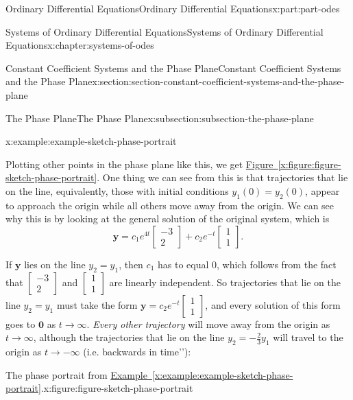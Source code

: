 \documentclass[twoside,10pt,]{book}
\newcommand{\xreffont}{\relax}
\numberwithin{equation}{part}
\renewcommand{\vec}[1]{\mathbf{#1}}
\begin{document}
\begin{partptx}{Ordinary Differential Equations}{}{Ordinary Differential Equations}{}{}{x:part:part-odes}
\begin{chapterptx}{Systems of Ordinary Differential Equations}{}{Systems of Ordinary Differential Equations}{}{}{x:chapter:systems-of-odes}
\begin{sectionptx}{Constant Coefficient Systems and the Phase Plane}{}{Constant Coefficient Systems and the Phase Plane}{}{}{x:section:section-constant-coefficient-systems-and-the-phase-plane}
\begin{subsectionptx}{The Phase Plane}{}{The Phase Plane}{}{}{x:subsection:subsection-the-phase-plane}
\begin{example}{}{x:example:example-sketch-phase-portrait}
\par
Plotting other points in the phase plane like this, we get \hyperref[x:figure:figure-sketch-phase-portrait]{Figure~{\xreffont\ref{x:figure:figure-sketch-phase-portrait}}}. One thing we can see from this is that trajectories that lie on the line, equivalently, those with initial conditions \(y_{1}(0) = y_{2}(0)\), appear to approach the origin while all others move away from the origin. We can see why this is by looking at the general solution of the original system, which is%
\begin{equation*}
\vec{y} = c_{1}e^{4t}\begin{bmatrix}-3\\2\end{bmatrix}+c_{2}e^{-t}\begin{bmatrix}1\\1\end{bmatrix}.
\end{equation*}
%
\par
If \(\vec{y}\) lies on the line \(y_{2} = y_{1}\), then \(c_{1}\) has to equal \(0\), which follows from the fact that \(\begin{bmatrix}-3\\2\end{bmatrix}\) and \(\begin{bmatrix}1\\1\end{bmatrix}\) are linearly independent. So trajectories that lie on the line \(y_{2} = y_{1}\) must take the form \(\vec{y} = c_{2}e^{-t}\begin{bmatrix}1\\1\end{bmatrix}\), and every solution of this form goes to \(\vec{0}\) as \(t\to\infty\). \emph{Every other trajectory} will move away from the origin as \(t\to\infty\), although the trajectories that lie on the line \(y_{2} = -\frac{2}{3}y_{1}\) will travel to the origin as \(t\to-\infty\) (i.e. \textasciigrave{}\textasciigrave{}backwards in time'{}'{}):%
\end{example}
\begin{figureptx}{The phase portrait from \hyperref[x:example:example-sketch-phase-portrait]{Example~{\xreffont\ref{x:example:example-sketch-phase-portrait}}}.}{x:figure:figure-sketch-phase-portrait}{}%
\begin{image}{0.25}{0.5}{0.25}%

\end{image}
\end{figureptx}
\end{subsectionptx}
\end{sectionptx}
\end{chapterptx}
\end{partptx}
\end{document}
